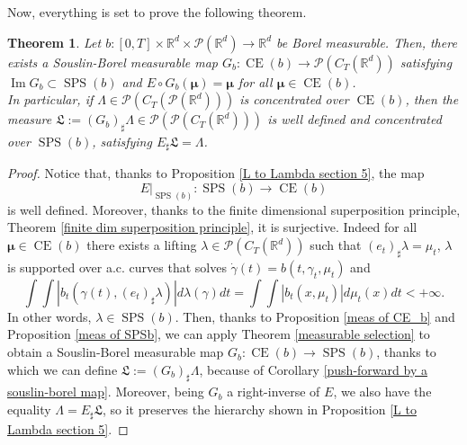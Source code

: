 \documentclass[10pt,leqno]{amsart}
\numberwithin{equation}{section}
\newtheorem{teorema}{Theorem}[section]
\newcommand{\R}{\mathbb{R}}
\newcommand{\PP}{\mathcal{P}}
\newcommand{\CE}{\operatorname{CE}}
\begin{document}
Now, everything is set to prove the following theorem.

\begin{teorema}\label{from Lambda to L theorem/corollary}
    Let $b:[0,T]\times \R^d \times \PP(\R^d) \to \R^d$ be Borel measurable. Then, there exists a Souslin-Borel measurable map $G_b:\operatorname{CE}(b) \to \PP(C_T(\R^d))$ satisfying $\operatorname{Im} G_b \subset \operatorname{SPS}(b)$ and $E \circ G_b(\boldsymbol{\mu}) = \boldsymbol{\mu}$ for all $\boldsymbol{\mu}\in \operatorname{CE}(b)$. 
    \\
    In particular, if $\Lambda\in \PP(C_T(\PP(\R^d)))$ is concentrated over $\CE(b)$, then the measure $\mathfrak{L}:= (G_b)_\sharp \Lambda \in \PP(\PP(C_T(\R^d)))$ is well defined and concentrated over $\operatorname{SPS}(b)$, satisfying $E_\sharp  \mathfrak{L} = \Lambda$. 
\end{teorema}


\begin{proof}
    Notice that, thanks to Proposition \ref{L to Lambda section 5}, the map 
\[E|_{\operatorname{SPS}(b)} : \operatorname{SPS}(b) \to \operatorname{CE}(b)\]
is well defined. Moreover, thanks to the finite dimensional superposition principle, Theorem \ref{finite dim superposition principle}, it is surjective. Indeed for all $\boldsymbol{\mu}\in \operatorname{CE}(b)$ there exists a lifting $\lambda\in \PP(C_T(\R^d))$ such that $(e_t)_\sharp \lambda = \mu_t$, $\lambda$ is supported over a.c. curves that solves $\dot\gamma(t) = b(t,\gamma_t,\mu_t)$ and 
\[\int \int |b_t(\gamma(t),(e_t)_\sharp \lambda)| d\lambda(\gamma) dt = \int \int |b_t(x,\mu_t)|d\mu_t(x) dt <+\infty.\]
In other words, $\lambda \in \operatorname{SPS}(b)$. Then, thanks to Proposition \ref{meas of CE_b} and Proposition \ref{meas of SPSb}, we can apply Theorem \ref{measurable selection} to obtain a Souslin-Borel measurable map $G_b: \operatorname{CE}(b) \to \operatorname{SPS}(b)$, thanks to which we can define $\mathfrak{L}:= (G_b)_\sharp  \Lambda$, because of Corollary \ref{push-forward by a souslin-borel map}. Moreover, being $G_b$ a right-inverse of $E$, we also have the equality $\Lambda = E_\sharp  \mathfrak{L}$, so it preserves the hierarchy shown in Proposition \ref{L to Lambda section 5}.
\end{proof}
\end{document}

